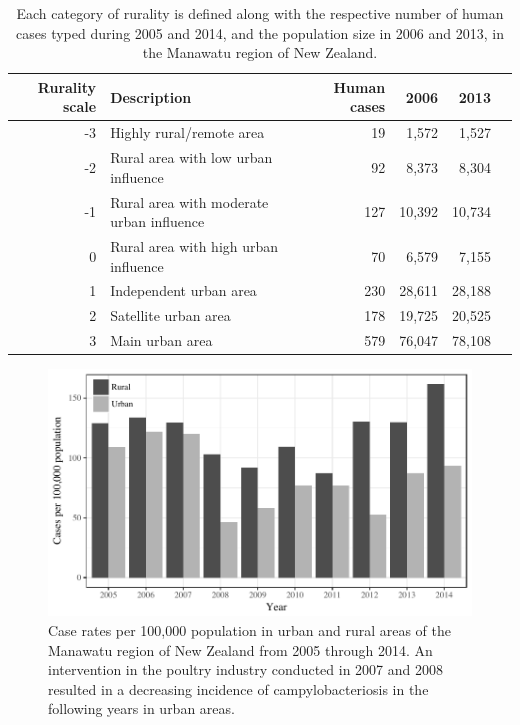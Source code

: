 \documentclass[times, doublespace]{simauth}%
\begin{document}
\begin{table}
  \centering
      \begin{tabular}{rlrrrr}
        \toprule
        Rurality scale & Description & Human cases & 2006 & 2013 \\ \midrule
        -3 & Highly rural/remote area & 19 & 1,572 & 1,527\\
        -2 & Rural area with low urban influence & 92 & 8,373 & 8,304\\
        -1 & Rural area with moderate urban influence & 127 & 10,392 & 10,734\\
        0 & Rural area with high urban influence & 70 & 6,579 & 7,155\\
        1 & Independent urban area & 230 & 28,611 & 28,188\\
        2 & Satellite urban area & 178 & 19,725 & 20,525\\
        3 & Main urban area & 579 & 76,047 & 78,108\\
        \bottomrule
      \end{tabular}
      \caption{Each category of rurality is defined along with the respective number of human cases typed during 2005 and 2014, and the population size in 2006 and 2013, in the Manawatu region of New Zealand.}
      \label{tab2}
\end{table}


\begin{figure}
  \centering
  \includegraphics[width=.8\linewidth]{Figures/case_rates}
  \caption{Case rates per 100,000 population in urban and rural areas of the Manawatu region of New Zealand from 2005 through 2014. An intervention in the poultry industry conducted in 2007 and 2008 resulted in a decreasing incidence of campylobacteriosis in the following years in urban areas.}
  \label{fig:case_rates}
\end{figure}
\end{document}
